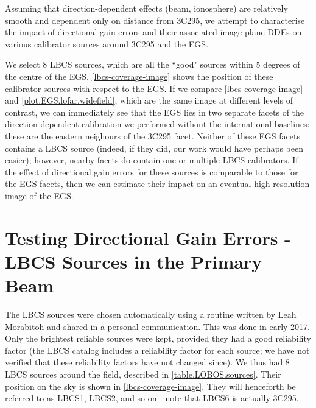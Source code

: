 \pg
Assuming that direction-dependent effects (beam, ionosphere) are relatively smooth and dependent only on distance from 3C295, we attempt to characterise the impact of directional gain errors and their associated image-plane DDEs on various calibrator sources around 3C295 and the EGS. 

\pg
We select 8 LBCS sources, which are all the ``good" sources within 5 degrees of the centre of the EGS. \cref{lbcs-coverage-image} shows the position of these calibrator sources with respect to the EGS. If we compare \cref{lbcs-coverage-image} and \cref{plot.EGS.lofar.widefield}, which are the same image at different levels of contrast, we can immediately see that the EGS lies in two separate facets of the direction-dependent calibration we performed without the international baselines: these are the eastern neighours of the 3C295 facet. Neither of these EGS facets contains a LBCS source (indeed, if they did, our work would have perhaps been easier); however, nearby facets do contain one or multiple LBCS calibrators. If the effect of directional gain errors for these sources is comparable to those for the EGS facets, then we can estimate their impact on an eventual high-resolution image of the EGS. 





\section{Testing Directional Gain Errors - LBCS Sources in the Primary Beam}\label{section.decorr}

\pg
The LBCS sources were chosen automatically using a routine written by Leah Morabitoh and shared in a personal communication. This was done in early 2017. Only the brightest reliable sources were kept, provided they had a good reliability factor (the LBCS catalog includes a reliability factor for each source; we have not verified that these reliability factors have not changed since). We thus had 8 LBCS sources around the field, described in \cref{table.LOBOS.sources}. Their position on the sky is shown in \cref{lbcs-coverage-image}. They will henceforth be referred to as LBCS1, LBCS2, and so on - note that LBCS6 is actually 3C295.

